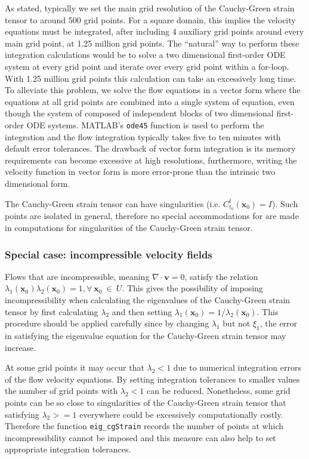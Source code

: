 \documentclass{article}
\begin{document}
As stated, typically we set the main grid resolution of the Cauchy-Green strain tensor to around 500 grid points. For a square domain, this implies the velocity equations must be integrated, after including 4 auxiliary grid points around every main grid point, at 1.25 million grid points. The ``natural'' way to perform these integration calculations would be to solve a two dimensional first-order ODE system at every grid point and iterate over every grid point within a for-loop. With 1.25 million grid points this calculation can take an excessively long time. To alleviate this problem, we solve the flow equations in a vector form where the equations at all grid points are combined into a single system of equation, even though the system of composed of independent blocks of two dimensional first-order ODE systems. MATLAB's \lstinline!ode45! function is used to perform the integration and the flow integration typically takes five to ten minutes with default error tolerances. The drawback of vector form integration is its memory requirements can become excessive at high resolutions, furthermore, writing the velocity function in vector form is more error-prone than the intrinsic two dimensional form.

The Cauchy-Green strain tensor can have singularities (i.e. $C_{t_0}^t(\boldsymbol x_0) = I$). Such points are isolated in general\parencite{delmarcelle94}, therefore no special accommodations for are made in computations for singularities of the Cauchy-Green strain tensor.

\subsubsection{Special case: incompressible velocity fields}

Flows that are incompressible, meaning $\nabla \cdot \boldsymbol v = 0$, satisfy the relation $\lambda_1(\boldsymbol x_0) \lambda_2(\boldsymbol x_0) = 1, \forall \: \boldsymbol x_0 \: \in \: U$\parencite{arnold78:_mathem}. This gives the possibility of imposing incompressibility when calculating the eigenvalues of the Cauchy-Green strain tensor by first calculating $\lambda_2$ and then setting $\lambda_1(\boldsymbol x_0) = 1/\lambda_2(\boldsymbol x_0)$. This procedure should be applied carefully since by changing $\lambda_1$ but not $\xi_1$, the error in satisfying the eigenvalue equation for the Cauchy-Green strain tensor may increase.

At some grid points it may occur that $\lambda_2 < 1$ due to numerical integration errors of the flow velocity equations. By setting integration tolerances to smaller values the number of grid points with $\lambda_2 < 1$ can be reduced. Nonetheless, some grid points can be so close to singularities of the Cauchy-Green strain tensor that satisfying $\lambda_2 >= 1$ everywhere could be excessively computationally costly. Therefore the function \lstinline!eig_cgStrain! records the number of points at which incompressibility cannot be imposed and this measure can also help to set appropriate integration tolerances.
\end{document}
